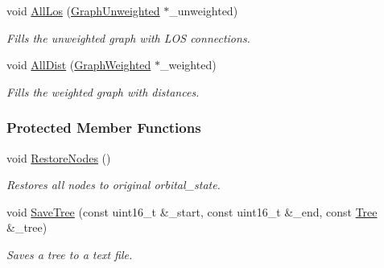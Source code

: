 \begin{DoxyCompactItemize}
void \hyperlink{classosse_1_1collaborate_1_1_scheduler_aab675402de557bac32d7cfc71aaf45b0}{All\+Los} (\hyperlink{classosse_1_1collaborate_1_1_graph_unweighted}{Graph\+Unweighted} $\ast$\+\_\+unweighted)
\begin{DoxyCompactList}\small\item\em Fills the unweighted graph with L\+OS connections. \end{DoxyCompactList}\item 
void \hyperlink{classosse_1_1collaborate_1_1_scheduler_a8dbb2201286d8c4f064cd1371d60ca90}{All\+Dist} (\hyperlink{classosse_1_1collaborate_1_1_graph_weighted}{Graph\+Weighted} $\ast$\+\_\+weighted)
\begin{DoxyCompactList}\small\item\em Fills the weighted graph with distances. \end{DoxyCompactList}\end{DoxyCompactItemize}
\subsubsection*{Protected Member Functions}
\begin{DoxyCompactItemize}
\item 
\mbox{\label{classosse_1_1collaborate_1_1_scheduler_a96b4b7064d05318493a95185cc41c478}} 
void \hyperlink{classosse_1_1collaborate_1_1_scheduler_a96b4b7064d05318493a95185cc41c478}{Restore\+Nodes} ()
\begin{DoxyCompactList}\small\item\em Restores all nodes to original orbital\+\_\+state. \end{DoxyCompactList}\item 
void \hyperlink{classosse_1_1collaborate_1_1_scheduler_af4731ceeb474f42e800d0683b2a9bfc8}{Save\+Tree} (const uint16\+\_\+t \&\+\_\+start, const uint16\+\_\+t \&\+\_\+end, const \hyperlink{classosse_1_1collaborate_1_1_tree}{Tree} \&\+\_\+tree)
\begin{DoxyCompactList}\small\item\em Saves a tree to a text file. \end{DoxyCompactList}\end{DoxyCompactItemize}
